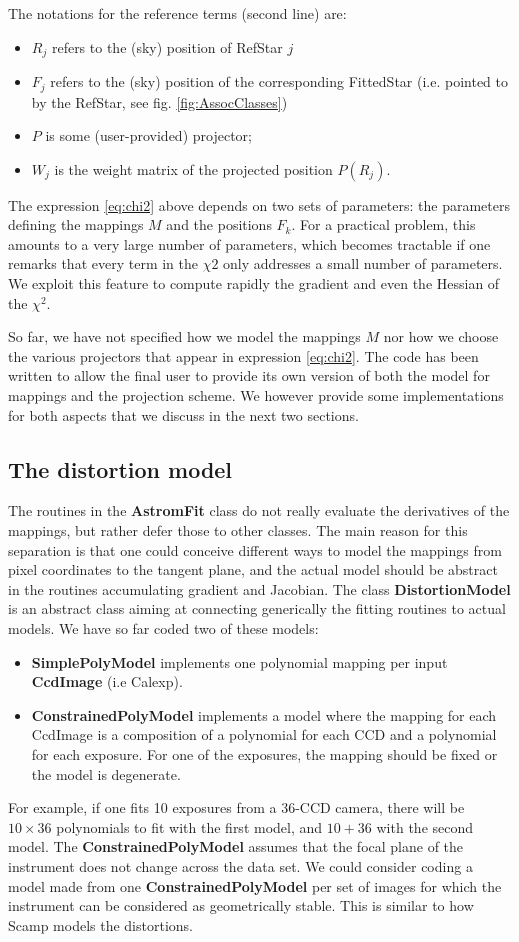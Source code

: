 \documentclass[a4paper,12pt]{scrartcl}
\newcommand{\ClName}[1]{{\bf #1}}
\def\bf{\normalfont\bfseries}
\begin{document}
The notations for the reference terms (second line) are:
\begin{itemize}
\item $R_j$ refers to the (sky) position of RefStar $j$
\item $F_j$ refers to the (sky) position of the corresponding
FittedStar (i.e. pointed to by the RefStar, see fig. \ref{fig:AssocClasses})
\item $P$ is some (user-provided) projector;
\item $W_j$ is the weight matrix of the projected position $P(R_j)$. 
\end{itemize}

The expression \ref{eq:chi2} above depends on two sets of parameters:
the parameters defining the mappings $M$ and the positions $F_k$.
For a practical problem, this amounts to a very large number of parameters,
which becomes tractable if one remarks that every term in the $\chi2$ 
only addresses a small number of parameters. We exploit this feature 
to compute rapidly the gradient and even the Hessian of the $\chi^2$.

So far, we have not specified how
we model the mappings $M$ nor how we choose the various projectors 
that appear in expression \ref{eq:chi2}. The code has been written
to allow the final user to provide its own version of both the model
for mappings and the projection scheme. We however provide some 
implementations for both aspects that we discuss in the next two sections.

\subsection{The distortion model}
The routines in the \ClName{AstromFit} class do not really evaluate
the derivatives of the mappings, but rather defer those to other classes.
The main reason for this separation is that one could conceive
different ways to model the mappings from pixel coordinates to
the tangent plane, and the actual model should be abstract
in the routines accumulating gradient and Jacobian. The class
\ClName{DistortionModel} is an abstract class aiming at
connecting generically the fitting routines to actual models.
We have so far coded two of these models:
\begin{itemize} 
\item \ClName{SimplePolyModel} implements 
one polynomial mapping per input \ClName{CcdImage} (i.e Calexp).
\item \ClName{ConstrainedPolyModel} implements a model
where the mapping for each CcdImage is a composition of a polynomial
for each CCD and a polynomial for each exposure. For one of the exposures,
the mapping should be fixed or the model is degenerate.
\end{itemize}
For example, if one fits 10 exposures from a 36-CCD camera,
there will be $10\times 36$ polynomials to fit with the first model, and
$10+36$ with the second model. The  \ClName{ConstrainedPolyModel}
assumes that the focal plane of the instrument does not change
across the data set. We could consider coding a model 
made from one \ClName{ConstrainedPolyModel} per set of images
for which the instrument can be considered as geometrically stable.
This is similar to how Scamp models the distortions.
\end{document}
